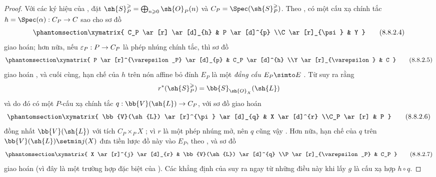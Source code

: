 \documentclass[oneside,10pt]{amsart}
\makeatletter
\renewcommand{\geq}{\geqslant}
\newcommand{\ega@arrow}[2]{\mathchoice{#1}{#2}{#2}{#2}}
\renewcommand{\to}{\ega@arrow{\longrightarrow}{\rightarrow}}
\newcommand{\oldpage}[2][]{\marginnote{\normalfont\footnotesize\textbf{#1}~|~#2}\ignorespaces}
\let\EGAOriginalLabel\label
\renewcommand{\label}[1]{\phantomsection\EGAOriginalLabel{#1}}
\newcommand*{\ega@labelnumber}[1]{\StrBehind{#1}{.}}
\newcommand{\eref}[1]{\hyperref[#1]{\normalfont{(\ega@labelnumber{#1})}}}
\makeatother
\begin{document}
\begin{proof}
Với các ký hiệu của , đặt $\sh{S}_P^\geq = \bigoplus_{n\geq0}\sh{O}_P(n)$ và $C_P=\Spec(\sh{S}_P^\geq)$.
Theo , có một cấu xạ chính tắc $h=\Spec(\alpha):C_P\to C$ sao cho sơ đồ
\[
\label{II.8.8.2.4}
  \xymatrix{
    C_P
      \ar[r]
      \ar[d]_{h}
  & P
      \ar[d]^{p}
  \\C
      \ar[r]_{\psi}
  & Y
  }
\tag{8.8.2.4}
\]
giao hoán; hơn nữa, nếu $\varepsilon_P:P\to C_P$ là phép nhúng chính tắc, thì sơ đồ
\[
\label{II.8.8.2.5}
  \xymatrix{
    P
      \ar[r]^{\varepsilon_P}
      \ar[d]_{p}
  & C_P
      \ar[d]^{h}
  \\Y
      \ar[r]_{\varepsilon}
  & C
  }
\tag{8.8.2.5}
\]
giao hoán , và cuối cùng, hạn chế của $h$ trên nón affine bỏ đỉnh $E_P$ là một \emph{đẳng cấu} $E_P\simto E$ .
Từ  suy ra rằng
\[
  r^*(\sh{S}_P^\geq)=\bb{S}_{\sh{O}_X}(\sh{L})
\]
\oldpage[II]{179}
và do đó có một $P$-cấu xạ chính tắc $q:\bb{V}(\sh{L})\to C_P$, với sơ đồ giao hoán
\[
\label{II.8.8.2.6}
  \xymatrix{
    \bb{V}(\sh{L})
      \ar[r]^{\pi}
      \ar[d]_{q}
  & X
      \ar[d]^{r}
  \\C_P
      \ar[r]
  & P
  }
\tag{8.8.2.6}
\]
đồng nhất $\bb{V}(\sh{L})$ với tích $C_P\times_P X$ ;
vì $r$ là một phép nhúng mở, nên $q$ cũng vậy .
Hơn nữa, hạn chế của $q$ trên $\bb{V}(\sh{L})\setmin j(X)$ đưa tiền lược đồ này vào $E_P$, theo , và sơ đồ
\[
\label{II.8.8.2.7}
  \xymatrix{
    X
      \ar[r]^{j}
      \ar[d]_{r}
  & \bb{V}(\sh{L})
      \ar[d]^{q}
  \\P
      \ar[r]_{\varepsilon_P}
  & C_P
  }
\tag{8.8.2.7}
\]
giao hoán (vì đây là một trường hợp đặc biệt của \eref{eq:2.8.5.1.3}).
Các khẳng định của  suy ra ngay từ những điều này khi lấy $g$ là cấu xạ hợp $h\circ q$.
\end{proof}
\end{document}
